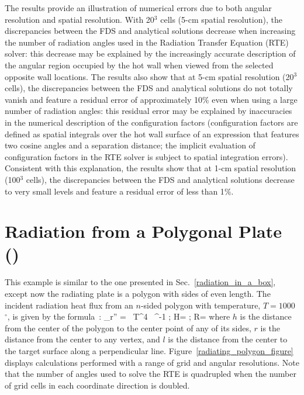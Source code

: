 \documentclass[11pt]{book}
\begin{document}
The results provide an illustration of numerical errors due to both angular resolution and spatial resolution. With 20$^3$ cells (5-cm spatial resolution), the discrepancies between the FDS and analytical solutions decrease when increasing the number of radiation angles used in the Radiation Transfer Equation (RTE) solver: this decrease may be explained by the increasingly accurate description of the angular region occupied by the hot wall when viewed from the selected opposite wall locations. The results also show that at 5-cm spatial resolution (20$^3$ cells), the discrepancies between the FDS and analytical solutions do not totally vanish and feature a residual error of approximately 10$\%$ even when using a large number of radiation angles: this residual error may be explained by inaccuracies in the numerical description of the configuration factors (configuration factors are defined as spatial integrals over the hot wall surface of an expression that features two cosine angles and a separation distance; the implicit evaluation of configuration factors in the RTE solver is subject to spatial integration errors). Consistent with this explanation, the results show that at 1-cm spatial resolution (100$^3$ cells), the discrepancies between the FDS and analytical solutions decrease to very small levels and feature a residual error of less than 1$\%$.

\section{Radiation from a Polygonal Plate (\texorpdfstring{}{radiating\_polygon}) }
\label{radiating_polygon}

This example is similar to the one presented in Sec.~\ref{radiation_in_a_box}, except now the radiating plate is a polygon with sides of even length. The incident radiation heat flux from an $n$-sided polygon with temperature, $T=1000$~$^\circ$, is given by the formula~\cite{Siegel:1}:
\be
   \dq_{\rm r}'' = \sigma \, T^4 \,  \; \tan^{-1}  \quad ; \quad H= \quad ; \quad R=
   \label{plate_view_factor_eq}
\ee
where $h$ is the distance from the center of the polygon to the center point of any of its sides, $r$ is the distance from the center to any vertex, and $l$ is the distance from the center to the target surface along a perpendicular line. Figure~\ref{radiating_polygon_figure} displays calculations performed with a range of grid and angular resolutions. Note that the number of angles used to solve the RTE is quadrupled when the number of grid cells in each coordinate direction is doubled.
\end{document}
